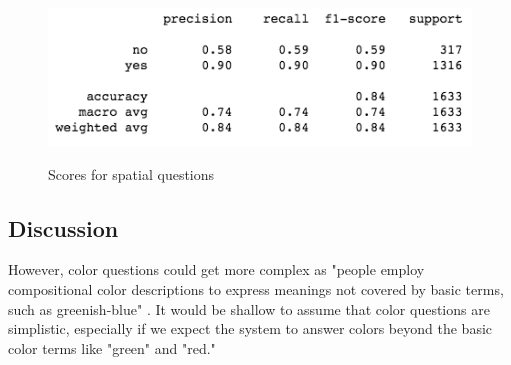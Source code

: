 \begin{figure}[H]
\includegraphics[scale=0.45]{latex/images/spatialscore.png}
\label{fig:HeatmapAfter}
\caption{Scores for spatial questions}
\end{figure}



\subsection{Discussion}

However, color questions could get more complex as "people employ compositional color descriptions to express meanings not covered by basic terms, such as greenish-blue" \cite{monroe2016learning}. It would be shallow to assume that color questions are simplistic, especially if we expect the system to answer colors beyond the basic color terms like "green" and "red." 

\cite{monroe2017colors}